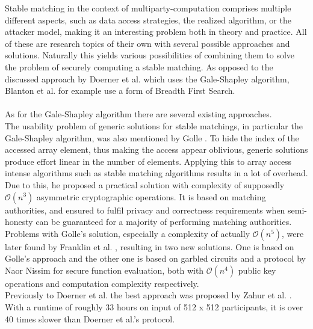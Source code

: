 Stable matching in the context of multiparty-computation comprises multiple different aspects, such as data access strategies, the realized algorithm, or the attacker model, making it an interesting problem both in theory and practice. All of these are research topics of their own with several possible approaches and solutions. Naturally this yields various possibilities of combining them to solve the problem of securely computing a stable matching. As opposed to the discussed approach by Doerner et al. \citep{smas} which uses the Gale-Shapley algorithm, Blanton et al. \citep{dogafscao} for example use a form of Breadth First Search.\\
\ \\As for the Gale-Shapley algorithm there are several existing approaches. 
\ \\The usability problem of generic solutions for stable matchings, in particular the Gale-Shapley algorithm, was also mentioned by Golle \citep{apsma}. To hide the index of the accessed array element, thus making the access appear oblivious, generic solutions produce effort linear in the number of elements. Applying this to array access intense algorithms such as stable matching algorithms results in a lot of overhead. Due to this, he proposed a \glqq practical\grqq{} solution with complexity of supposedly $\mathcal{O}(n^3)$ asymmetric cryptographic operations. It is based on matching authorities, and ensured to fulfil privacy and correctness requirements when semi-honesty can be guaranteed for a majority of performing matching authorities. \\
Problems with Golle's solution, especially a complexity of actually $\mathcal{O}(n^5)$, were later found by Franklin et al. \citep{iefpsm}, resulting in two new solutions. One is based on Golle's approach and the other one is based on garbled circuits and a protocol by Naor Nissim for secure function evaluation, both with $\mathcal{O}(n^4)$ public key operations and computation complexity respectively.\\
Previously to Doerner et al. the best approach was proposed by Zahur et al. \citep{rsqo}. With a runtime of roughly 33 hours on input of 512 x 512 participants, it is over 40 times slower than Doerner et al.'s protocol. 